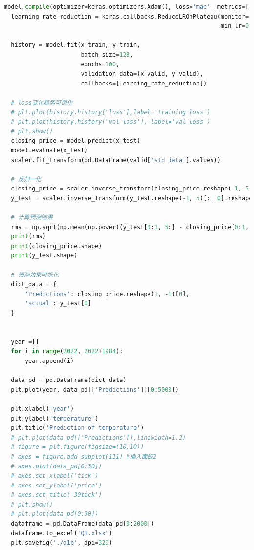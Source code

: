 \documentclass{apmcmthesis}
\begin{document}
\begin{lstlisting}[language=python, caption={The python source code of LSTM}]
  model.compile(optimizer=keras.optimizers.Adam(), loss='mae', metrics=['accuracy'])
  learning_rate_reduction = keras.callbacks.ReduceLROnPlateau(monitor='val_loss', patience=3, factor=0.7,
                                                              min_lr=0.000000005)
  
  history = model.fit(x_train, y_train,
                      batch_size=128,
                      epochs=100,
                      validation_data=(x_valid, y_valid),
                      callbacks=[learning_rate_reduction])
  
  # loss变化趋势可视化
  # plt.plot(history.history['loss'],label='training loss')
  # plt.plot(history.history['val_loss'], label='val loss')
  # plt.show()
  closing_price = model.predict(x_test)
  model.evaluate(x_test)
  scaler.fit_transform(pd.DataFrame(valid['std data'].values))
  
  # 反归一化
  closing_price = scaler.inverse_transform(closing_price.reshape(-1, 5)[:, 0].reshape(1, -1))  # 只取第一列
  y_test = scaler.inverse_transform(y_test.reshape(-1, 5)[:, 0].reshape(1, -1))
  
  # 计算预测结果
  rms = np.sqrt(np.mean(np.power((y_test[0:1, 5:] - closing_price[0:1, 5:]), 2)))
  print(rms)
  print(closing_price.shape)
  print(y_test.shape)
  
  # 预测效果可视化
  dict_data = {
      'Predictions': closing_price.reshape(1, -1)[0],
      'actual': y_test[0]
  }
  
  
  year =[]
  for i in range(2022, 2022+1984):
      year.append(i)
  
  data_pd = pd.DataFrame(dict_data)
  plt.plot(year, data_pd[['Predictions']][0:5000])
  
  plt.xlabel('year')
  plt.ylabel('temperature')
  plt.title('Prediction of temperature')
  # plt.plot(data_pd[['Predictions']],linewidth=1.2)
  # figure = plt.figure(figsize=(10,10))
  # axes = figure.add_subplot(111) #插入面板2
  # axes.plot(data_pd[0:30])
  # axes.set_xlabel('tick')
  # axes.set_ylabel('price')
  # axes.set_title('30tick')
  # plt.show()
  # plt.plot(data_pd[0:30])
  dataframe = pd.DataFrame(data_pd[0:2000])
  dataframe.to_excel('Q1.xlsx')
  plt.savefig('./q1b', dpi=320)
\end{lstlisting}
\end{document}
